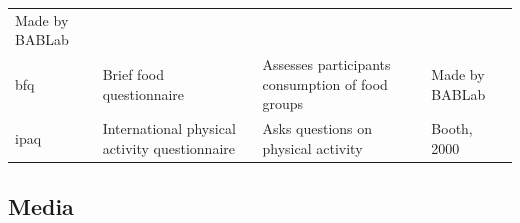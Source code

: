 \documentclass[]{book}
\begin{document}
\begin{longtable}[]{@{}llll@{}}
\begin{minipage}[t]{0.18\columnwidth}
Made by BABLab\strut
\end{minipage}\tabularnewline
\begin{minipage}[t]{0.22\columnwidth}\raggedright
bfq\strut
\end{minipage} & \begin{minipage}[t]{0.27\columnwidth}\raggedright
Brief food questionnaire\strut
\end{minipage} & \begin{minipage}[t]{0.22\columnwidth}\raggedright
Assesses participants consumption of food groups\strut
\end{minipage} & \begin{minipage}[t]{0.18\columnwidth}\raggedright
Made by BABLab\strut
\end{minipage}\tabularnewline
\begin{minipage}[t]{0.22\columnwidth}\raggedright
ipaq\strut
\end{minipage} & \begin{minipage}[t]{0.27\columnwidth}\raggedright
International physical activity questionnaire\strut
\end{minipage} & \begin{minipage}[t]{0.22\columnwidth}\raggedright
Asks questions on physical activity\strut
\end{minipage} & \begin{minipage}[t]{0.18\columnwidth}\raggedright
Booth, 2000\strut
\end{minipage}\tabularnewline
\bottomrule
\end{longtable}

\hypertarget{media}{%
\subsection{Media}\label{media}}
\end{document}
